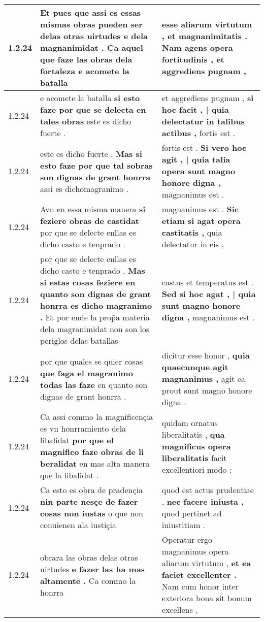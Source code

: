 \begin{tabular}{|p{1cm}|p{6.5cm}|p{6.5cm}|}
1.2.24 & Et pues que assi es essas mismas obras pueden ser delas otras uirtudes e dela magnanimidat . \textbf{ Ca aquel que faze las obras dela fortaleza } e acomete la batalla & esse aliarum virtutum , et magnanimitatis . \textbf{ Nam agens opera fortitudinis , } et aggrediens pugnam , \\\hline
1.2.24 & e acomete la batalla \textbf{ si esto faze por que se delecta en tales obras } este es dicho fuerte . & et aggrediens pugnam , \textbf{ si hoc facit , | quia delectatur in talibus actibus , } fortis est . \\\hline
1.2.24 & este es dicho fuerte . \textbf{ Mas si esto faze por que tal sobras son dignas de grant honrra } assi es dichomagranimo . & fortis est . \textbf{ Si vero hoc agit , | quia talia opera sunt magno honore digna , } magnanimus est . \\\hline
1.2.24 & Avn en essa misma manera \textbf{ si feziere obras de castidat } por que se delecte enllas es dicho casto e tenprado . & magnanimus est . \textbf{ Sic etiam si agat opera castitatis , } quia delectatur in eis , \\\hline
1.2.24 & por que se delecte enllas es dicho casto e tenprado . \textbf{ Mas si estas cosas feziere en quanto son dignas de grant honrra es dicho magranimo . } Et por ende la prop̃a materia dela magranimidat non son los periglos delas batallas & castus et temperatus est . \textbf{ Sed si hoc agat , | quia sunt magno honore digna , } magnanimus est . \\\hline
1.2.24 & por que quales se quier cosas \textbf{ que faga el magranimo todas las faze } en quanto son dignas de grant honrra . & dicitur esse honor , \textbf{ quia quaecunque agit magnanimus , } agit ea prout sunt magno honore digna . \\\hline
1.2.24 & Ca assi commo la magnificençia es vn honrramiento dela libalidat \textbf{ por que el magnifico faze obras de li beralidat } en mas alta manera que la libalidat . & quidam ornatus liberalitatis , \textbf{ qua magnificus opera liberalitatis } facit excellentiori modo : \\\hline
1.2.24 & Ca esto es obra de pradençia \textbf{ nin parte nesçe de fazer cosas non iustas } o que non conuienen ala iustiçia & quod est actus prudentiae , \textbf{ nec facere iniusta , } quod pertinet ad iniustitiam . \\\hline
1.2.24 & obrara las obras delas otras uirtudes \textbf{ e fazer las ha mas altamente . } Ca commo la honrra & Operatur ergo magnanimus opera aliarum virtutum , \textbf{ et ea faciet excellenter . } Nam cum honor inter exteriora bona sit bonum excellens , \\\hline

\end{tabular}
